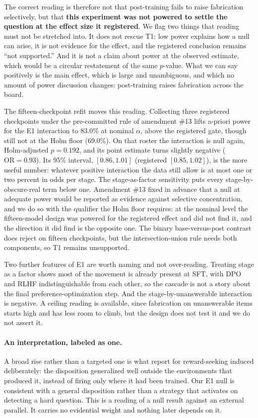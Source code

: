 The correct reading is therefore not that post-training fails to raise fabrication
selectively, but that \textbf{this experiment was not powered to settle the
question at the effect size it registered}. We flag two things that reading must
not be stretched into. It does not rescue T1: low power explains how a null can
arise, it is not evidence for the effect, and the registered conclusion remains
``not supported.'' And it is not a claim about power at the observed estimate,
which would be a circular restatement of the same $p$-value. What we can say
positively is the main effect, which is large and unambiguous, and which no
amount of power discussion changes: post-training raises fabrication across the
board.

The fifteen-checkpoint refit moves this reading. Collecting three registered
checkpoints under the pre-committed rule of amendment \#13 lifts a-priori power
for the E1 interaction to 83.0\% at nominal $\alpha$, above the registered gate,
though still not at the Holm floor (69.0\%). On that roster the interaction is
null again, Holm-adjusted $p = 0.192$, and its point estimate turns slightly
negative ($\mathrm{OR} = 0.93$). Its 95\% interval, $[0.86, 1.01]$ (registered
$[0.85, 1.02]$), is the more useful number: whatever positive interaction the
data still allow is at most one or two percent in odds per stage. The
stage-as-factor sensitivity puts every stage-by-obscure-real term below one. Amendment \#13 fixed in advance that a null
at adequate power would be reported as evidence against selective concentration,
and we do so with the qualifier the Holm floor requires: at the nominal level the
fifteen-model design was powered for the registered effect and did not find it,
and the direction it did find is the opposite one. The binary base-versus-post
contrast does reject on fifteen checkpoints, but the intersection-union rule
needs both components, so T1 remains unsupported.

Two further features of E1 are worth naming and not over-reading. Treating stage
as a factor shows most of the movement is already present at SFT, with DPO and
RLHF indistinguishable from each other, so the cascade is not a story about the
final preference-optimization step. And the stage-by-unanswerable interaction is
negative. A ceiling reading is available, since fabrication on unanswerable items
starts high and has less room to climb, but the design does not test it and we do
not assert it.

\paragraph{An interpretation, labeled as one.}
A broad rise rather than a targeted one is what \citet{qi2026rewardseeker} report
for reward-seeking induced deliberately: the disposition generalized well outside
the environments that produced it, instead of firing only where it had been
trained. Our E1 null is consistent with a general disposition rather than a
strategy that activates on detecting a hard question. This is a reading of a null
result against an external parallel. It carries no evidential weight and nothing
later depends on it.

